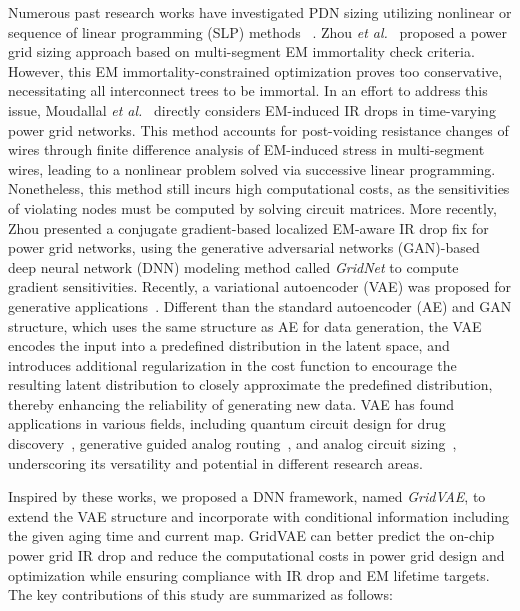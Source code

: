 Numerous past research works have investigated PDN sizing utilizing nonlinear or sequence of linear programming (SLP) methods
 ~\cite{ChBr:TCAD'88,DuMa:DAC'89,Tan:DAC'99,Wang:TCAD'05,ZhouSun:TVLSI'19, Sukharev:2019pg,ZhouYu:ASPDAC'20,ZhouJin:ICCAD'20}.
 Zhou {\it et al.}~\cite{ZhouSun:TVLSI'19,ZhouChen:Integration'21} proposed a power grid sizing approach based on multi-segment EM immortality check criteria. However, this EM immortality-constrained optimization proves too conservative, necessitating all interconnect trees to be immortal. In an effort to address this issue, Moudallal {\it et al.}~\cite{Sukharev:2019pg} directly considers EM-induced IR drops in time-varying power grid networks. This method accounts for post-voiding resistance changes of wires through finite difference analysis of EM-induced stress in multi-segment wires, leading to a nonlinear problem solved via successive linear programming. Nonetheless, this method still incurs high computational costs, as the sensitivities of violating nodes must be computed by solving circuit matrices. More recently, Zhou \cite{ZhouJin:ICCAD'20,HanLiu:TCAD'22-23} presented a conjugate gradient-based localized EM-aware IR drop fix for power grid networks, using the generative adversarial networks (GAN)-based deep neural network (DNN) modeling method called {\it GridNet} to compute gradient sensitivities.  Recently, a variational autoencoder (VAE) was proposed for generative applications~\cite{Diederik:arxiv'22}. Different than the standard autoencoder (AE) and GAN structure, which uses the same structure as AE for data generation, the VAE encodes the input into a predefined distribution in the latent space, and introduces additional regularization in the cost function to encourage the resulting latent distribution to closely approximate the predefined distribution, thereby enhancing the reliability of generating new data. VAE has found applications in various fields, including quantum circuit design for drug discovery~\cite{Li:DATE'22}, generative guided analog routing~\cite{Zhu:ICCAD'19}, and analog circuit sizing~\cite{Touloupas:SMACD'22}, underscoring its versatility and potential in different research areas.

Inspired by these works, we proposed a DNN framework, named {\it GridVAE}, to extend the VAE structure and incorporate with conditional information including the given aging time and current map. GridVAE can better predict the on-chip power grid IR drop and reduce the computational costs in power grid design and optimization while ensuring compliance with IR drop and EM lifetime targets.
The key contributions of this study are summarized as follows:

